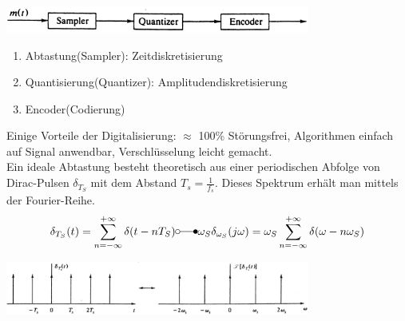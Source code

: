
\begin{center}
	\includegraphics[width=10cm]{bilder/dig_pcm_blockdiagramm.png}
\end{center}
\begin{enumerate}
  \item Abtastung(Sampler): Zeitdiskretisierung 
  \item Quantisierung(Quantizer): Amplitudendiskretisierung
  \item Encoder(Codierung)
\end{enumerate}

Einige Vorteile der Digitalisierung: $\approx$ 100\% Störungsfrei, Algorithmen
einfach auf Signal anwendbar, Verschlüsselung leicht gemacht.\\


Ein ideale Abtastung besteht theoretisch aus einer periodischen Abfolge von Dirac-Pulsen
$\delta_{T_S}$ mit dem Abstand $T_s = \frac{1}{f_s}$. Dieses Spektrum erhält man mittels der
Fourier-Reihe. \\ 
$$ \delta_{T_S}(t) = \sum\limits_{n=-\infty}^{+\infty} \delta(t-nT_S) \laplace 
\omega_S \delta_{\omega_S} (j \omega) = 
\omega_S \sum\limits_{n=-\infty}^{+\infty} \delta(\omega - n \omega_S)$$
	\begin{center}
		\includegraphics[width=10cm]{bilder/dig_sampler_ideal.png}
	\end{center}

